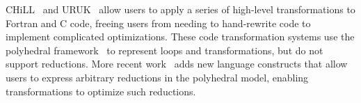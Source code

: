 CHiLL~\cite{Hall2010} and URUK~\cite{Girbal2006} allow users to apply a series of high-level transformations to Fortran and C code, freeing users from needing to hand-rewrite code to implement complicated optimizations.  These code transformation systems use the polyhedral framework~\cite{IRIGOIN1988,FEAUTRIER1991} to represent loops and transformations, but do not support reductions.  More recent work~\cite{Reddy:2016:RDL:2967938.2967950} adds new language constructs that allow users to express arbitrary reductions in the polyhedral model, enabling transformations to optimize such reductions.

